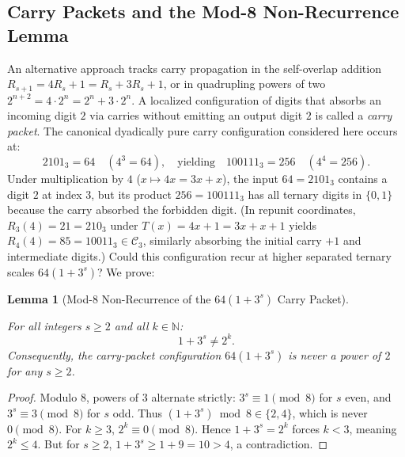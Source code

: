 \documentclass[11pt,reqno]{amsart}
\theoremstyle{plain}
\newtheorem{lemma}[theorem]{Lemma}
\theoremstyle{definition}
\theoremstyle{remark}
\newcommand{\C}{\mathcal{C}}
\newcommand{\N}{\mathbb{N}}
\begin{document}
\subsection{Carry Packets and the Mod-8 Non-Recurrence Lemma}
An alternative approach tracks carry propagation in the self-overlap addition $R_{s+1} = 4 R_s + 1 = R_s + 3 R_s + 1$, or in quadrupling powers of two $2^{n+2} = 4 \cdot 2^n = 2^n + 3 \cdot 2^n$. A localized configuration of digits that absorbs an incoming digit $2$ via carries without emitting an output digit $2$ is called a \emph{carry packet}. The canonical dyadically pure carry configuration considered here occurs at:
\begin{equation}
2101_3 = 64 \quad (4^3 = 64), \quad \text{yielding} \quad 100111_3 = 256 \quad (4^4 = 256).
\end{equation}
Under multiplication by $4$ ($x \mapsto 4x = 3x + x$), the input $64 = 2101_3$ contains a digit $2$ at index $3$, but its product $256 = 100111_3$ has all ternary digits in $\{0, 1\}$ because the carry absorbed the forbidden digit. (In repunit coordinates, $R_3(4) = 21 = 210_3$ under $T(x) = 4x+1 = 3x+x+1$ yields $R_4(4) = 85 = 10011_3 \in \C_3$, similarly absorbing the initial carry $+1$ and intermediate digits.) Could this configuration recur at higher separated ternary scales $64(1 + 3^s)$? We prove:
\begin{lemma}[Mod-8 Non-Recurrence of the $64(1+3^s)$ Carry Packet]\label{lem:non_recurrence}

For all integers $s \ge 2$ and all $k \in \N$:
\begin{equation}
1 + 3^s \ne 2^k.
\end{equation}
Consequently, the carry-packet configuration $64(1 + 3^s)$ is never a power of $2$ for any $s \ge 2$.
\end{lemma}

\begin{proof}
Modulo $8$, powers of $3$ alternate strictly: $3^s \equiv 1 \pmod 8$ for $s$ even, and $3^s \equiv 3 \pmod 8$ for $s$ odd. Thus $(1 + 3^s) \bmod 8 \in \{2, 4\}$, which is never $0 \pmod 8$. For $k \ge 3$, $2^k \equiv 0 \pmod 8$. Hence $1 + 3^s = 2^k$ forces $k < 3$, meaning $2^k \le 4$. But for $s \ge 2$, $1 + 3^s \ge 1 + 9 = 10 > 4$, a contradiction.
\end{proof}
\end{document}
